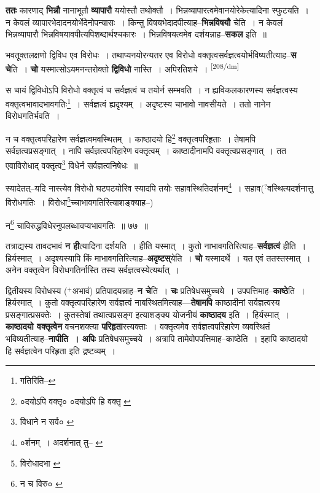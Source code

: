 \documentclass[article,12pt,a4paper]{memoir}
\newcommand{\unclear}[1]{($^{?}$#1)}
\newcommand{\add}[1]{($^{+}$#1)}
\begin{document}
	  \pstart \textbf{ततः} कारणाद् \textbf{भिन्नौ} नानाभूतौ \textbf{व्यापारौ} ययोस्तौ तथोक्तौ । भिन्नव्यापारत्वमेवानयोरेकेत्यादिना स्फुटयति । न केवलं व्यापारभेदादनयोर्भेदेनोपन्यासः । किन्तु विषयभेदादपीत्याह--\textbf{भिन्नविषयौ} चेति । न केवलं भिन्नव्यापारौ भिन्नविषयावपीत्यपिशब्दार्थश्चकारः । भिन्नविषयत्वमेव दर्शयन्नाह--\textbf{सकल} इति ॥
	\pend
      

	  \pstart भवतूक्तलक्षणो द्विविध एव विरोधः । तथाप्यनयोरन्यतर एव विरोधो वक्तृत्वसर्वज्ञत्वयोर्भविष्यतीत्याह--\textbf{स चे}ति । \textbf{चो} यस्मात्सोऽयमनन्तरोक्तो \textbf{द्विविधो} नास्ति । अपिरतिशये ।
	\pend
      \leavevmode\textsuperscript{\rmlatinfont\tiny [208/dm]}

	  \pstart स चायं द्विविधोऽपि विरोधो वक्तृत्वं च सर्वज्ञत्वं च तयोर्न सम्भवति । न ह्यविकलकारणस्य सर्वज्ञत्वस्य वक्तृत्वभावादभावगतिः\footnote{गतिरिति--\cite{dp-msD}} । सर्वज्ञत्वं ह्यदृश्यम् । अदृष्टस्य चाभावो नावसीयते । ततो नानेन विरोधगतिर्भवति ।
	\pend
       

	  \pstart न च वक्तृत्वपरिहारेण सर्वज्ञत्वमवस्थितम् । काष्ठादयो हि\footnote{०दयोऽपि वक्तृ० \cite{dp-msA} \cite{dp-msB} \cite{dp-edP} \cite{dp-edH} \cite{dp-edE} \cite{dp-edN} ०दयोऽपि हि वक्तृ \cite{dp-msC}} वक्तृत्वपरिहृताः । तेषामपि सर्वज्ञत्वप्रसङ्गात् । नापि सर्वज्ञत्वपरिहारेण वक्तृत्वम् । काष्ठादीनामपि वक्तृत्वप्रसङ्गात् । तत एवाविरोधाद् वक्तृत्व\footnote{विधाने न सर्व० \cite{dp-msA} \cite{dp-msB} \cite{dp-edP} \cite{dp-edH} \cite{dp-edE} \cite{dp-edN}} विधेर्न सर्वज्ञत्वनिषेधः ॥
	\pend
       

	  \pstart स्यादेतत्--यदि नास्त्येव विरोधो घटपटयोरिव स्यादपि तयोः सहावस्थितिदर्शनम्\footnote{०र्शनम् । अदर्शनात् तु--\cite{dp-msA} \cite{dp-msB} \cite{dp-msD} \cite{dp-edP} \cite{dp-edH} \cite{dp-edE} \cite{dp-edN}} । सहाव\unclear{वस्थित्यदर्शनात्तु विरोधगतिः । विरोधा\footnote{विरोधादभा \cite{dp-msB} \cite{dp-msD}}च्चाभावगतिरित्याशङ्क्याह--}
	\pend
      

	  \pstart न\footnote{न च विरु० \cite{dp-msC}} चाविरुद्धविधेरनुपलब्धावप्यभावगतिः ॥ ७७ ॥
	\pend
      

	  \pstart तत्राद्यस्य तावदभावं \textbf{न ही}त्यादिना दर्शयति । हीति यस्मात् । कुतो नाभावगतिरित्याह--\textbf{सर्वज्ञत्वं} हीति । हिर्यस्मात् । अदृश्यस्यापि किं माभावगतिरित्याह--\textbf{अदृष्टस्}येति । \textbf{चो} यस्मादर्थे । यत एवं ततस्तस्मात् । अनेन वक्तृत्वेन विरोधगतिर्नास्ति तस्य सर्वज्ञत्वस्येत्यर्थात् ।
	\pend
      

	  \pstart द्वितीयस्य विरोधस्य \add{अभावं} प्रतिपादयन्नाह--\textbf{न चे}ति । \textbf{चः} प्रतिषेधसमुच्चये । उपपत्तिमाह--\textbf{काष्ठे}ति । हिर्यस्मात् । कुतो वक्तृत्वपरिहारेण सर्वज्ञत्वं नाबस्थितमित्याह—\textbf{तेषामपि} काष्ठादीनां सर्वज्ञत्वस्य प्रसङ्गात्प्रसक्तेः । कुतस्तेषां तथात्वप्रसङ्ग इत्याशङ्क्य योजनीयं \textbf{काष्ठादय} इति । हिर्यस्मात् । \textbf{काष्ठादयो वक्तृत्वेन} वचनशक्त्या \textbf{परिहृता}स्त्यक्ताः । वक्तृत्वमेव सर्वज्ञत्वपरिहारेण व्यवस्थितं भविष्यतीत्याह--\textbf{नापीति । अपिः} प्रतिषेधसमुच्चये । अत्रापि तामेवोपपत्तिमाह--काष्ठेति । इहापि काष्ठादयो हि सर्वज्ञत्वेन परिहृता इति द्रष्टव्यम् ।
	\pend
      
\end{document}
